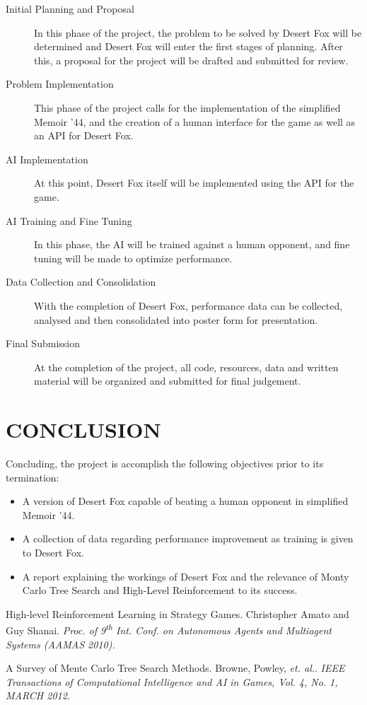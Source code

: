 \documentclass[twocolumn]{article}
\begin{document}
\begin{description}
\item[Initial Planning and Proposal]
In this phase of the project, the problem to be solved by Desert Fox will be determined and Desert Fox will enter the first stages of planning. After this, a proposal for the project will be drafted and submitted for review.

\item[Problem Implementation]
This phase of the project calls for the implementation of the simplified Memoir '44, and the creation of a human interface for the game as well as an API for Desert Fox.

\item[AI Implementation]
At this point, Desert Fox itself will be implemented using the API for the game.

\item[AI Training and Fine Tuning]
In this phase, the AI will be trained against a human opponent, and fine tuning will be made to optimize performance.

\item[Data Collection and Consolidation]
With the completion of Desert Fox, performance data can be collected, analysed and then consolidated into poster form for presentation.

\item[Final Submission]
At the completion of the project, all code, resources, data and written material will be organized and submitted for final judgement.

\end{description}


\section{CONCLUSION}

Concluding, the project is accomplish the following objectives prior to its termination:

\begin{itemize}
\item A version of Desert Fox capable of beating a human opponent in simplified Memoir '44.
\item A collection of data regarding performance improvement as training is given to Desert Fox.
\item A report explaining the workings of Desert Fox and the relevance of Monty Carlo Tree Search and High-Level Reinforcement to its success.
\end{itemize}


\begin{thebibliography}{9}

High-level Reinforcement Learning in Strategy Games. Christopher Amato and Guy Shanai. {\it Proc. of 9\textsuperscript{th} Int. Conf. on Autonomous Agents and Multiagent Systems (AAMAS 2010).}

A Survey of Mente Carlo Tree Search Methods. Browne, Powley, {\it et. al.}. {\it IEEE Transactions of Computational Intelligence and AI in Games, Vol. 4, No. 1, MARCH 2012.}

\end{thebibliography}
\end{document}
